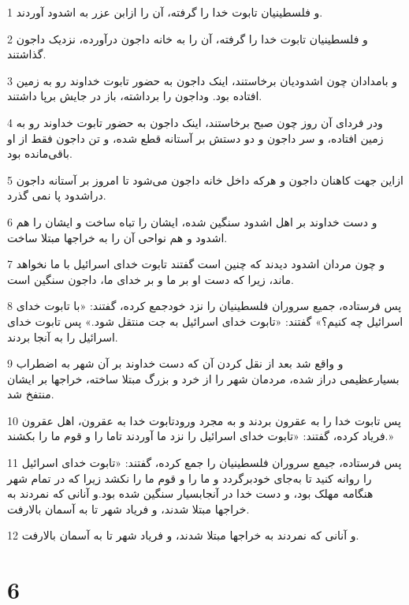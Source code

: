 \par 1 و فلسطینیان تابوت خدا را گرفته، آن را ازابن عزر به اشدود آوردند.
\par 2 و فلسطینیان تابوت خدا را گرفته، آن را به خانه داجون درآورده، نزدیک داجون گذاشتند.
\par 3 و بامدادان چون اشدودیان برخاستند، اینک داجون به حضور تابوت خداوند رو به زمین افتاده بود. وداجون را برداشته، باز در جایش برپا داشتند.
\par 4 ودر فردای آن روز چون صبح برخاستند، اینک داجون به حضور تابوت خداوند رو به زمین افتاده، و سر داجون و دو دستش بر آستانه قطع شده، و تن داجون فقط از او باقی‌مانده بود.
\par 5 ازاین جهت کاهنان داجون و هر‌که داخل خانه داجون می‌شود تا امروز بر آستانه داجون دراشدود پا نمی گذرد.
\par 6 و دست خداوند بر اهل اشدود سنگین شده، ایشان را تباه ساخت و ایشان را هم اشدود و هم نواحی آن را به خراجها مبتلا ساخت.
\par 7 و چون مردان اشدود دیدند که چنین است گفتند تابوت خدای اسرائیل با ما نخواهد ماند، زیرا که دست او بر ما و بر خدای ما، داجون سنگین است.
\par 8 پس فرستاده، جمیع سروران فلسطینیان را نزد خودجمع کرده، گفتند: «با تابوت خدای اسرائیل چه کنیم؟» گفتند: «تابوت خدای اسرائیل به جت منتقل شود.» پس تابوت خدای اسرائیل را به آنجا بردند.
\par 9 و واقع شد بعد از نقل کردن آن که دست خداوند بر آن شهر به اضطراب بسیارعظیمی دراز شده، مردمان شهر را از خرد و بزرگ مبتلا ساخته، خراجها بر ایشان منتفخ شد.
\par 10 پس تابوت خدا را به عقرون بردند و به مجرد ورودتابوت خدا به عقرون، اهل عقرون فریاد کرده، گفتند: «تابوت خدای اسرائیل را نزد ما آوردند تاما را و قوم ما را بکشند.»
\par 11 پس فرستاده، جیمع سروران فلسطینیان را جمع کرده، گفتند: «تابوت خدای اسرائیل را روانه کنید تا به‌جای خودبرگردد و ما را و قوم ما را نکشد زیرا که در تمام شهر هنگامه مهلک بود، و دست خدا در آنجابسیار سنگین شده بود.و آنانی که نمردند به خراجها مبتلا شدند، و فریاد شهر تا به آسمان بالارفت.
\par 12 و آنانی که نمردند به خراجها مبتلا شدند، و فریاد شهر تا به آسمان بالارفت.
 
\chapter{6}

